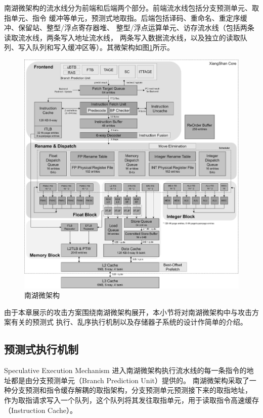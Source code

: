 南湖微架构的流水线分为前端和后端两个部分。前端流水线包括分支预测单元、取指单元、指令
缓冲等单元，预测式地取指。后端包括译码、重命名、重定序缓冲、保留站、整型/浮点寄存器堆、
整型/浮点运算单元、访存流水线（包括两条读取流水线，两条写入地址流水线，
两条写入数据流水线，以及独立的读取队列、写入队列和写入缓冲区等）。其微架构如图\ref{fig:nanhu-uarch}所示。

\begin{figure}[ht]
	\centering
	\includegraphics[width=\textwidth]{figs/nanhu.png}
	\caption{南湖微架构\cite{noauthor_openxiangshan/xiangshan:_nodate}}
	\label{fig:nanhu-uarch}
\end{figure}

由于本章展示的攻击方案围绕南湖微架构展开，本小节将对南湖微架构中与攻击方案有关的预测式
执行、乱序执行机制以及存储器子系统的设计作简单的介绍。

\clearpage

\subsection{预测式执行机制}{Speculative Execution Mechanism}
进入南湖微架构执行流水线的每一条指令的地址都是由分支预测单元（Branch Prediction Unit）提供的。
南湖微架构采取了一种分支预测和指令缓存解耦的取指架构，分支预测单元预测接下来的取指地址，
作为取指请求写入一个队列，这个队列将其发往取指单元，用于读取指令高速缓存（Instruction Cache）。

